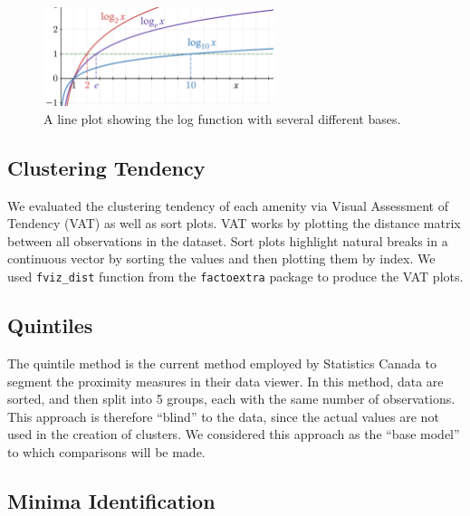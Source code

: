 \documentclass[11pt, a4paper]{article}
\begin{document}
\begin{figure}[H]
\centering
\includegraphics[width=0.6\textwidth]{./distributions/logtransform.png}
\caption[Log-transform]{A line plot showing the log function with several different bases.}\label{logtransform}
\end{figure}







\subsection{Clustering Tendency}


We evaluated the clustering tendency of each amenity via Visual Assessment of Tendency (VAT) as well as sort plots. VAT works by plotting the distance matrix between all observations in the dataset. Sort plots highlight natural breaks in a continuous vector by sorting the values and then plotting them by index. We used \texttt{fviz\_dist} function from the \texttt{factoextra} package to produce the VAT plots.





\subsection{Quintiles}


The quintile method is the current method employed by Statistics Canada to segment the proximity measures in their data viewer. In this method, data are sorted, and then split into 5 groups, each with the same number of observations. This approach is therefore ``blind'' to the data, since the actual values are not used in the creation of clusters. We considered this approach as the “base model” to which comparisons will be made.







\subsection{Minima Identification}
\end{document}
